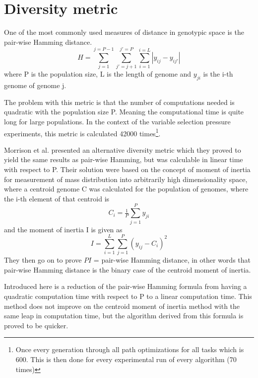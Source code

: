 \chapter{Diversity metric}\label{Populationdiversity}
One of the most commonly used measures of distance in genotypic space\cite{populationDiversity} is the pair-wise Hamming distance. 
\begin{equation}
    \label{eq:Hamming}
    H=\sum_{j=1}^{j=P-1}\sum_{{j}'=j+1}^{{j}'=P}\sum_{i=1}^{i=L}\left |y_{ij}-y_{i{j}'}\right |
\end{equation}
where P is the population size, L is the length of genome and \(y_{ji}\) is the i-th genome of genome j.

The problem with this metric is that the number of computations needed is quadratic with the population size P. Meaning the computational time is quite long for large populations. In the context of the variable selection pressure experiments, this metric is calculated 42000 times\footnote{Once every generation through all path optimizations for all tasks which is 600. This is then done for every experimental run of every algorithm (70 times)}.

Morrison et al. presented an alternative diversity metric which they proved to yield the same results as pair-wise Hamming, but was calculable in linear time with respect to P. Their solution were based on the concept of moment of inertia for measurement of mass distribution into arbitrarily high dimensionality space, where a centroid genome C was calculated for the population of genomes, where the i-th element of that centroid is
\begin{equation}
    \label{eq:centroid}
    C_{i}=\tfrac{1}{P}\sum_{j=1}^{P}y_{ji}
\end{equation}
and the moment of inertia I is given as 
\begin{equation}
    \label{eq:Inertiadiversity}
    I  = \sum_{i=1}^{L}\sum_{j=1}^{P}\left ( y_{ij}-C_{i} \right )^{2}
\end{equation}
They then go on to prove \(PI\) = pair-wise Hamming distance, in other words that pair-wise Hamming distance is the binary case of the centroid moment of inertia.

Introduced here is a reduction of the pair-wise Hamming formula from having a quadratic computation time with respect to P to a linear computation time. This method does not improve on the centroid moment of inertia method with the same leap in computation time, but the algorithm derived from this formula is proved to be quicker. 


